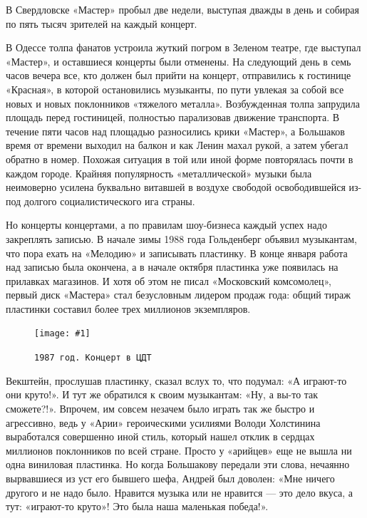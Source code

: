 \documentclass[10pt, twoside]{book}
\newcommand{\myincludegraphics}[1]{\texttt{[image: \#1]}}
\begin{document}
В Свердловске «Мастер» пробыл две недели, выступая дважды в день и собирая по пять тысяч зрителей на каждый концерт.

В Одессе толпа фанатов устроила жуткий погром в Зеленом театре, где выступал «Мастер», и оставшиеся концерты были
отменены. На следующий день в семь часов вечера все, кто должен был прийти на концерт, отправились к гостинице
«Красная», в которой остановились музыканты, по пути увлекая за собой все новых и новых поклонников «тяжелого металла».
Возбужденная толпа запрудила площадь перед гостиницей, полностью парализовав движение транспорта. В течение пяти часов
над площадью разносились крики «Мастер», а Большаков время от времени выходил на балкон и как Ленин махал рукой, а затем
убегал обратно в номер. Похожая ситуация в той или иной форме повторялась почти в каждом городе. Крайняя популярность
«металлической» музыки была неимоверно усилена буквально витавшей в воздухе свободой освободившейся из-под долгого
социалистического ига страны.

Но концерты концертами, а по правилам шоу-бизнеса каждый успех надо закреплять записью. В начале зимы 1988 года
Гольденберг объявил музыкантам, что пора ехать на «Мелодию» и записывать пластинку. В конце января работа над записью
была окончена, а в начале октября пластинка уже появилась на прилавках магазинов. И хотя об этом не писал «Московский
комсомолец», первый диск «Мастера» стал безусловным лидером продаж года: общий тираж пластинки составил более трех
миллионов экземпляров.

\begin{figure}[h]
    \centering
    \myincludegraphics{Image21}
    \caption{\texttt{1987 год. Концерт в ЦДТ}}
\end{figure}

Векштейн, прослушав пластинку, сказал вслух то, что подумал: «А играют-то они круто!». И тут же обратился к своим
музыкантам: «Ну, а вы-то так сможете?!». Впрочем, им совсем незачем было играть так же быстро и агрессивно, ведь у
«Арии» героическими усилиями Володи Холстинина выработался совершенно иной стиль, который нашел отклик в сердцах
миллионов поклонников по всей стране. Просто у «арийцев» еще не вышла ни одна виниловая пластинка. Но когда Большакову
передали эти слова, нечаянно вырвавшиеся из уст его бывшего шефа, Андрей был доволен: «Мне ничего другого и не надо
было. Нравится музыка или не нравится — это дело вкуса, а тут: «играют-то круто»! Это была наша маленькая победа!».
\end{document}
